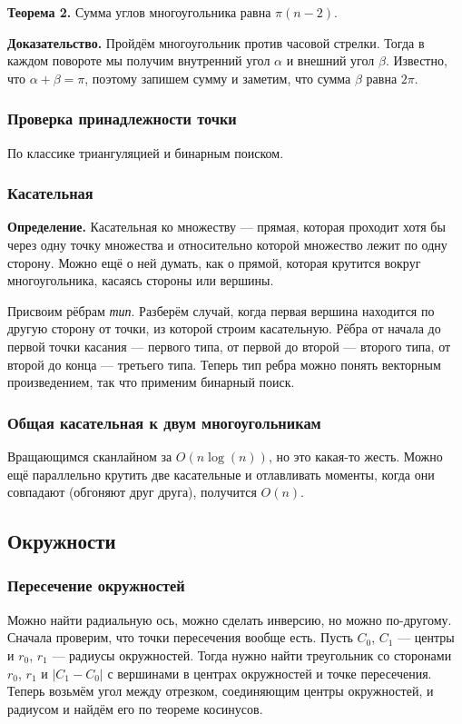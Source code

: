 \textbf{Теорема 2.} Сумма углов многоугольника равна $\pi(n - 2)$.

\textbf{Доказательство.} Пройдём многоугольник против часовой стрелки.
Тогда в каждом повороте мы получим внутренний угол $\alpha$ и внешний угол $\beta$.
Известно, что $\alpha + \beta = \pi$, поэтому запишем сумму и заметим, что сумма $\beta$ равна $2\pi$.

\subsubsection{Проверка принадлежности точки}
По классике триангуляцией и бинарным поиском.

\subsubsection{Касательная}
\textbf{Определение.} Касательная ко множеству --- прямая, которая проходит хотя бы через одну точку множества и относительно которой множество лежит по одну сторону.
Можно ещё о ней думать, как о прямой, которая крутится вокруг многоугольника, касаясь стороны или вершины.

Присвоим рёбрам \textit{тип}. Разберём случай, когда первая вершина находится по другую сторону от точки, из которой строим касательную.
Рёбра от начала до первой точки касания --- первого типа, от первой до второй --- второго типа, от второй до конца --- третьего типа.
Теперь тип ребра можно понять векторным произведением, так что применим бинарный поиск.

\subsubsection{Общая касательная к двум многоугольникам}
Вращающимся сканлайном за $O(n \log(n))$, но это какая-то жесть.
Можно ещё параллельно крутить две касательные и отлавливать моменты, когда они совпадают (обгоняют друг друга), получится $O(n)$.

\subsection{Окружности}
\subsubsection{Пересечение окружностей}
Можно найти радиальную ось, можно сделать инверсию, но можно по-другому.
Сначала проверим, что точки пересечения вообще есть.
Пусть $C_0$, $C_1$ --- центры и $r_0$, $r_1$ --- радиусы окружностей.
Тогда нужно найти треугольник со сторонами $r_0$, $r_1$ и $|C_1 - C_0|$ с вершинами в центрах окружностей и точке пересечения.
Теперь возьмём угол между отрезком, соединяющим центры окружностей, и радиусом и найдём его по теореме косинусов.

